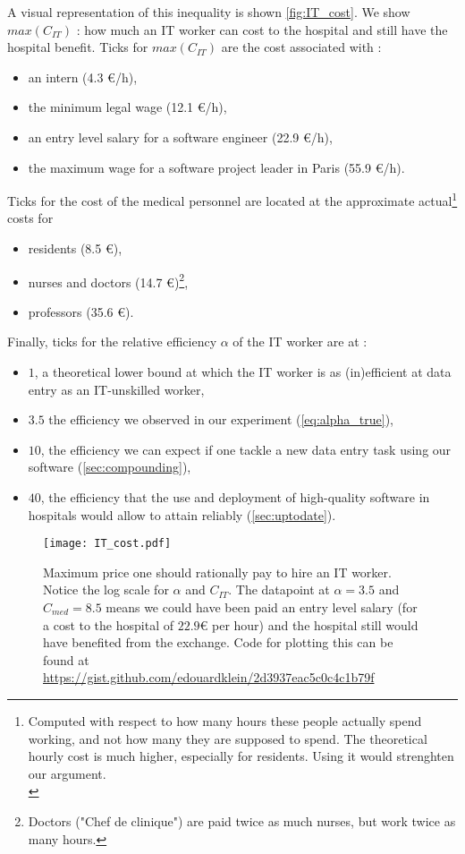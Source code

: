 \documentclass[nobib]{tufte-handout}
\begin{document}
A visual representation of this inequality is shown \autoref{fig:IT_cost}. We show $max(C_{IT})$ : how much an IT worker can cost to the hospital and still have the hospital benefit. Ticks for $max(C_{IT})$ are the cost associated with \cite{salaires} :
\begin{itemize}
\item an intern (4.3 €/h),
\item the minimum legal wage (12.1 €/h), 
\item an entry level salary for a software engineer (22.9 €/h),
\item the maximum wage for a software project leader in Paris (55.9 €/h).
\end{itemize}

Ticks for the cost of the medical personnel are located at the approximate actual\footnote{Computed with respect to how many hours these people actually spend working, and not how many they are supposed to spend. The theoretical hourly cost is much higher, especially for residents. Using it would strenghten our argument.\\\vspace{1em}} costs for 
\begin{itemize}
\item residents (8.5 €),
\item nurses and doctors (14.7 €)\footnote{Doctors ("Chef de clinique") are paid twice as much nurses, but work twice as many hours.},
\item professors (35.6 €).
\end{itemize}

Finally, ticks for the relative efficiency $\alpha$ of the IT worker are at :
\begin{itemize}
\item $1$, a theoretical lower bound at which the IT worker is as (in)efficient at data entry as an IT-unskilled worker,
\item  $3.5$ the efficiency we observed in our experiment (\autoref{eq:alpha_true}),
\item $10$, the efficiency we can expect if one tackle a new data entry task using our software (\autoref{sec:compounding}),
\item $40$, the efficiency that the use and deployment of high-quality software in hospitals would allow to attain reliably (\autoref{sec:uptodate}).
\end{itemize}

\begin{figure*}
\center
\texttt{[image: IT\_cost.pdf]}
\caption{Maximum price one should rationally pay to hire an IT worker. Notice the log scale for $\alpha$ and $C_{IT}$. The datapoint at $\alpha=3.5$ and $C_{med} = 8.5$ means we could have been paid an entry level salary (for a cost to the hospital of $22.9$€ per hour) and the hospital still would have benefited from the exchange. Code for plotting this can be found at \url{https://gist.github.com/edouardklein/2d3937eac5c0c4c1b79f} }
\label{fig:IT_cost}
\end{figure*}
\end{document}
